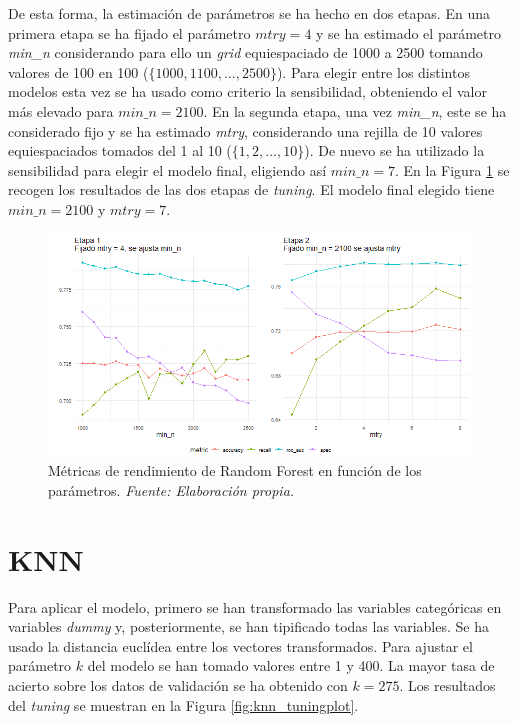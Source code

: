 \documentclass[12pt,a4paper,]{book}
\newcounter{dummy}
\numberwithin{dummy}{section}
\theoremstyle{ocrenumbox}
\theoremstyle{blacknumex}
\theoremstyle{blacknumbox}
\theoremstyle{ocrenum}
\theoremstyle{ocrenum}
\begin{document}
De esta forma, la estimación de parámetros se ha hecho en dos etapas. En
una primera etapa se ha fijado el parámetro \(mtry = 4\) y se ha
estimado el parámetro \emph{min\_n} considerando para ello un
\emph{grid} equiespaciado de 1000 a 2500 tomando valores de 100 en 100
(\(\{1000,1100,...,2500\}\)). Para elegir entre los distintos modelos
esta vez se ha usado como criterio la sensibilidad, obteniendo el valor
más elevado para \(min\_n = 2100\). En la segunda etapa, una vez
\emph{min\_n}, este se ha considerado fijo y se ha estimado \emph{mtry},
considerando una rejilla de 10 valores equiespaciados tomados del 1 al
10 (\(\{1,2,...,10\}\)). De nuevo se ha utilizado la sensibilidad para
elegir el modelo final, eligiendo así \(min\_n = 7\). En la Figura
\ref{fig:rf_tuningplot} se recogen los resultados de las dos etapas de
\emph{tuning}. El modelo final elegido tiene \(min\_n = 2100\) y
\(mtry = 7\).

\begin{figure}[h!]
\centering
\includegraphics[width =\textwidth]{graficos/rf_tuningplot.png}
\caption[Métricas de rendimiento de Random Forest en función de los parámetros]{Métricas de rendimiento de Random Forest en función de los parámetros.  \it Fuente: Elaboración propia.}
\label{fig:rf_tuningplot}
\end{figure}

\hypertarget{knn}{%
\section{KNN}\label{knn}}

Para aplicar el modelo, primero se han transformado las variables
categóricas en variables \emph{dummy} y, posteriormente, se han
tipificado todas las variables. Se ha usado la distancia euclídea entre
los vectores transformados. Para ajustar el parámetro \(k\) del modelo
se han tomado valores entre 1 y 400. La mayor tasa de acierto sobre los
datos de validación se ha obtenido con \(k = 275\). Los resultados del
\emph{tuning} se muestran en la Figura \ref{fig:knn_tuningplot}.
\end{document}
